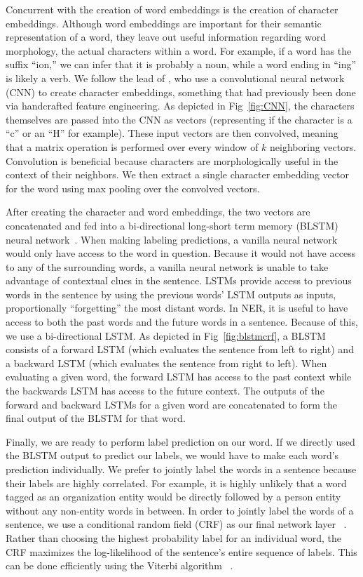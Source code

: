 Concurrent with the creation of word embeddings is the creation of character embeddings. Although word embeddings are important for their semantic representation of a word, they leave out useful information regarding word morphology, the actual characters within a word. For example, if a word has the suffix ``ion,'' we can infer that it is probably a noun, while a word ending in ``ing'' is likely a verb. We follow the lead of \cite{characterembeddings}, who use a convolutional neural network (CNN) to create character embeddings, something that had previously been done via handcrafted feature engineering. As depicted in Fig~\ref{fig:CNN}, the characters themselves are passed into the CNN as vectors (representing if the character is a ``c'' or an ``H'' for example). These input vectors are then convolved, meaning that a matrix operation is performed over every window of $k$ neighboring vectors. Convolution is beneficial because characters are morphologically useful in the context of their neighbors. We then extract a single character embedding vector for the word using max pooling over the convolved vectors. 

After creating the character and word embeddings, the two vectors are concatenated and fed into a bi-directional long-short term memory (BLSTM) neural network~\citep{DBLP:conf/acl/MaH16}. When making labeling predictions, a vanilla neural network would only have access to the word in question. Because it would not have access to any of the surrounding words, a vanilla neural network is unable to take advantage of contextual clues in the sentence. LSTMs provide access to previous words in the sentence by using the previous words' LSTM outputs as inputs, proportionally ``forgetting'' the most distant words. In NER, it is useful to have access to both the past words and the future words in a sentence. Because of this, we use a bi-directional LSTM. As depicted in Fig~\ref{fig:blstmcrf}, a BLSTM consists of a forward LSTM (which evaluates the sentence from left to right) and a backward LSTM (which evaluates the sentence from right to left). When evaluating a given word, the forward LSTM has access to the past context while the backwards LSTM has access to the future context. The outputs of the forward and backward LSTMs for a given word are concatenated to form the final output of the BLSTM for that word.

Finally, we are ready to perform label prediction on our word.
If we directly used the BLSTM output to predict our labels, we would have to make each word's prediction individually. We prefer to jointly label the words in a sentence because their labels are highly correlated. For example, it is highly unlikely that a word tagged as an organization entity would be directly followed by a person entity without any non-entity words in between. In order to jointly label the words of a sentence, we use a conditional random field (CRF) as our final network layer ~\citep{DBLP:conf/acl/MaH16}. Rather than choosing the highest probability label for an individual word, the CRF maximizes the log-likelihood of the sentence's entire sequence of labels. This can be done efficiently using the Viterbi algorithm ~\citep{ViterbiAlg}.

